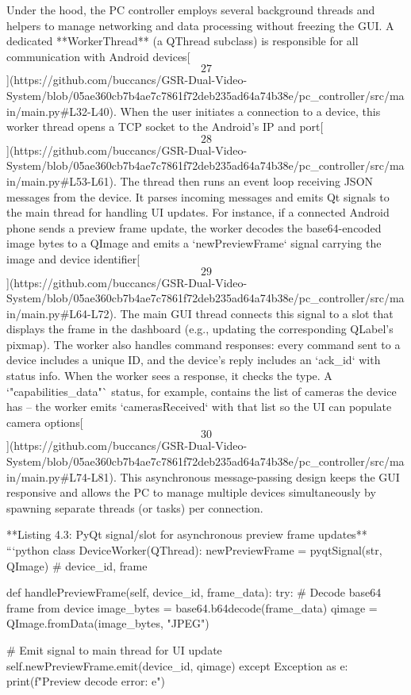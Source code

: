 \documentclass[12pt,a4paper]{article}
\begin{document}
{Under the hood, the PC controller employs several background threads and
helpers to manage networking and data processing without freezing the
GUI. A dedicated **WorkerThread** (a QThread subclass) is responsible
for all communication with Android
devices[\[27\]](https://github.com/buccancs/GSR-Dual-Video-System/blob/05ae360cb7b4ae7c7861f72deb235ad64a74b38e/pc_controller/src/main/main.py#L32-L40).
When the user initiates a connection to a device, this worker thread
opens a TCP socket to the Android's IP and
port[\[28\]](https://github.com/buccancs/GSR-Dual-Video-System/blob/05ae360cb7b4ae7c7861f72deb235ad64a74b38e/pc_controller/src/main/main.py#L53-L61).
The thread then runs an event loop receiving JSON messages from the
device. It parses incoming messages and emits Qt signals to the main
thread for handling UI updates. For instance, if a connected Android
phone sends a preview frame update, the worker decodes the
base64-encoded image bytes to a QImage and emits a `newPreviewFrame`
signal carrying the image and device
identifier[\[29\]](https://github.com/buccancs/GSR-Dual-Video-System/blob/05ae360cb7b4ae7c7861f72deb235ad64a74b38e/pc_controller/src/main/main.py#L64-L72).
The main GUI thread connects this signal to a slot that displays the
frame in the dashboard (e.g., updating the corresponding QLabel's
pixmap). The worker also handles command responses: every command sent
to a device includes a unique ID, and the device's reply includes an
`ack_id` with status info. When the worker sees a response, it checks
the type. A `"capabilities_data"` status, for example, contains the list
of cameras the device has -- the worker emits `camerasReceived` with
that list so the UI can populate camera
options[\[30\]](https://github.com/buccancs/GSR-Dual-Video-System/blob/05ae360cb7b4ae7c7861f72deb235ad64a74b38e/pc_controller/src/main/main.py#L74-L81).
This asynchronous message-passing design keeps the GUI responsive and
allows the PC to manage multiple devices simultaneously by spawning
separate threads (or tasks) per connection.

**Listing 4.3: PyQt signal/slot for asynchronous preview frame updates**
```python
class DeviceWorker(QThread):
    newPreviewFrame = pyqtSignal(str, QImage)  # device_id, frame
    
    def handlePreviewFrame(self, device_id, frame_data):
        try:
            # Decode base64 frame from device
            image_bytes = base64.b64decode(frame_data)
            qimage = QImage.fromData(image_bytes, "JPEG")
            
            # Emit signal to main thread for UI update
            self.newPreviewFrame.emit(device_id, qimage)
        except Exception as e:
            print(f"Preview decode error: {e}")

}
\end{document}
